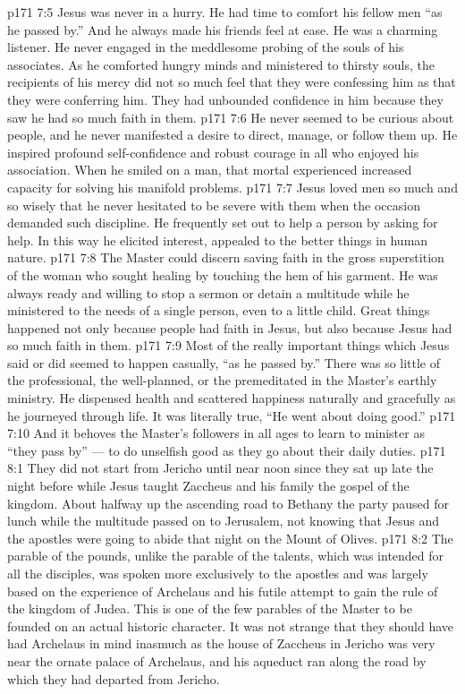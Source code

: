 \vs p171 7:5 Jesus was never in a hurry. He had time to comfort his fellow men “as he passed by.” And he always made his friends feel at ease. He was a charming listener. He never engaged in the meddlesome probing of the souls of his associates. As he comforted hungry minds and ministered to thirsty souls, the recipients of his mercy did not so much feel that they were confessing  him as that they were conferring  him. They had unbounded confidence in him because they saw he had so much faith in them.
\vs p171 7:6 He never seemed to be curious about people, and he never manifested a desire to direct, manage, or follow them up. He inspired profound self\hyp{}confidence and robust courage in all who enjoyed his association. When he smiled on a man, that mortal experienced increased capacity for solving his manifold problems.
\vs p171 7:7 Jesus loved men so much and so wisely that he never hesitated to be severe with them when the occasion demanded such discipline. He frequently set out to help a person by asking for help. In this way he elicited interest, appealed to the better things in human nature.
\vs p171 7:8 The Master could discern saving faith in the gross superstition of the woman who sought healing by touching the hem of his garment. He was always ready and willing to stop a sermon or detain a multitude while he ministered to the needs of a single person, even to a little child. Great things happened not only because people had faith in Jesus, but also because Jesus had so much faith in them.
\vs p171 7:9 Most of the really important things which Jesus said or did seemed to happen casually, “as he passed by.” There was so little of the professional, the well\hyp{}planned, or the premeditated in the Master’s earthly ministry. He dispensed health and scattered happiness naturally and gracefully as he journeyed through life. It was literally true, “He went about doing good.”
\vs p171 7:10 And it behoves the Master’s followers in all ages to learn to minister as “they pass by” --- to do unselfish good as they go about their daily duties.
\vs p171 8:1 They did not start from Jericho until near noon since they sat up late the night before while Jesus taught Zaccheus and his family the gospel of the kingdom. About halfway up the ascending road to Bethany the party paused for lunch while the multitude passed on to Jerusalem, not knowing that Jesus and the apostles were going to abide that night on the Mount of Olives.
\vs p171 8:2 The parable of the pounds, unlike the parable of the talents, which was intended for all the disciples, was spoken more exclusively to the apostles and was largely based on the experience of Archelaus and his futile attempt to gain the rule of the kingdom of Judea. This is one of the few parables of the Master to be founded on an actual historic character. It was not strange that they should have had Archelaus in mind inasmuch as the house of Zaccheus in Jericho was very near the ornate palace of Archelaus, and his aqueduct ran along the road by which they had departed from Jericho.

